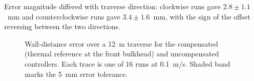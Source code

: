 Error magnitude differed with traverse direction: clockwise runs gave
$2.8 \pm 1.1$~mm and counterclockwise runs gave $3.4 \pm 1.6$~mm, with the sign of the
offset reversing between the two directions.

\begin{figure}[t]
\centering
\caption{Wall-distance error over a 12~m traverse for the compensated (thermal
reference at the front bulkhead) and uncompensated controllers. Each trace is one of
16 runs at 0.1~m/s. Shaded band marks the 5~mm error tolerance.}
\label{fig:error}
\end{figure}

